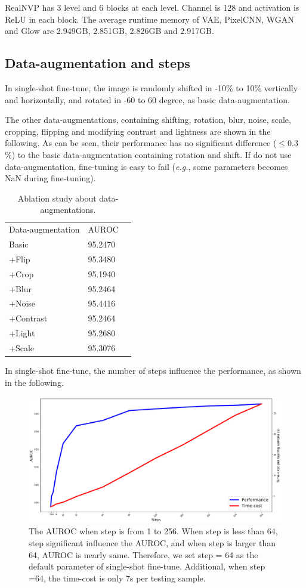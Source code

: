 \documentclass[a3paper]{article}
\newcommand{\EG}{\textit{e.g.}, }
\begin{document}
RealNVP has 3 level and 6 blocks at each level. Channel is 128 and activation is ReLU in each block. 
The average runtime memory of VAE, PixelCNN, WGAN and Glow are 2.949GB, 2.851GB, 2.826GB and 2.917GB. 

\subsection{Data-augmentation and steps}
In single-shot fine-tune, the image is randomly shifted in -10\% to 10\% vertically and horizontally, and rotated in -60 to 60 degree, as basic data-augmentation.

The other data-augmentations, containing shifting, rotation, blur, noise, scale, cropping, flipping and modifying contrast and lightness are shown in the following. As can be seen, their performance has no significant difference ($\leq 0.3$\%) to the basic data-augmentation containing rotation and shift. If do not use data-augmentation, fine-tuning is easy to fail (\EG some parameters becomes NaN during fine-tuning). 

\begin{table}[t]
	\centering
	\begin{tabular}{lll}
		\toprule
		Data-augmentation & AUROC \\
		Basic & 95.2470\\
		+Flip & 95.3480\\
		+Crop & 95.1940\\
		+Blur & 95.2464\\
		+Noise & 95.4416\\
		+Contrast & 95.2464\\
		+Light & 95.2680\\
		+Scale & 95.3076\\
		\bottomrule
	\end{tabular}
	\caption{Ablation study about data-augmentations. }
\end{table}

In single-shot fine-tune, the number of steps influence the performance, as shown in the following.

\begin{figure}
\centering
\includegraphics[width=\textwidth]{auroc_steps}	
\caption{The AUROC when step is from 1 to 256. When step is less than 64, step significant influence the AUROC, and when step is larger than 64, AUROC is nearly same. Therefore, we set step = 64 as the default parameter of single-shot fine-tune. Additional, when step =64, the time-cost is only 7s per testing sample.}
\end{figure}
\end{document}
